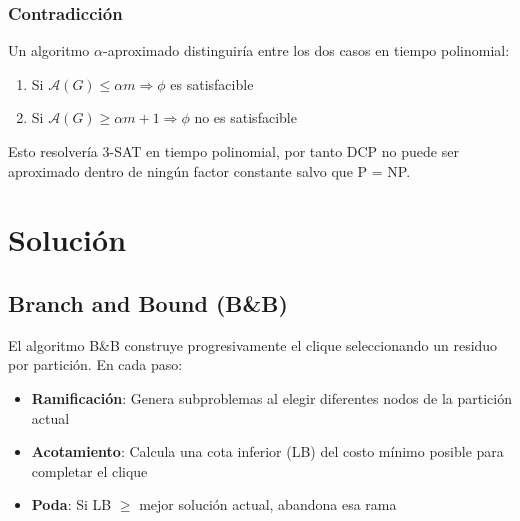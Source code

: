 \documentclass[letterpaper, 12pt]{report}
\begin{document}
\subsection{Contradicción}
Un algoritmo $\alpha$-aproximado distinguiría entre los dos casos en tiempo polinomial:
\begin{enumerate}
    \item Si $\mathcal{A}(G) \leq \alpha m \Rightarrow \phi$ es satisfacible
    \item Si $\mathcal{A}(G) \geq \alpha m + 1 \Rightarrow \phi$ no es satisfacible
\end{enumerate}

Esto resolvería 3-SAT en tiempo polinomial, por tanto DCP no puede ser aproximado dentro de ningún factor constante salvo que P = NP.





\chapter{Solución}



\section{Branch and Bound (B\&B)}

El algoritmo B\&B construye progresivamente el clique seleccionando un residuo por partición. En cada paso:

\begin{itemize}
\item \textbf{Ramificación}: Genera subproblemas al elegir diferentes nodos de la partición actual
\item \textbf{Acotamiento}: Calcula una cota inferior (LB) del costo mínimo posible para completar el clique
\item \textbf{Poda}: Si LB $\geq$ mejor solución actual, abandona esa rama
\end{itemize}
\end{document}
